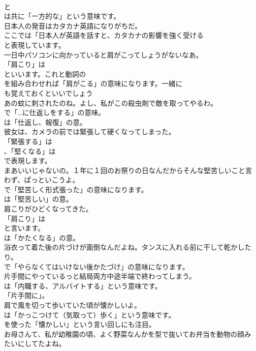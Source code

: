 \documentclass[8pt]{extreport}
\begin{document}
\begin{CJK}{UTF8}{min}
\\	と
\\	は共に「一方的な」という意味です。	
\\	日本人の発音はカタカナ英語になりがちだ。 
\\	ここでは「日本人が英語を話すと、カタカナの影響を強く受ける
\\	と表現しています。	
\\	一日中パソコンに向かっていると肩がこってしょうがないなあ。 
\\	「肩こり」は
\\	といいます。これと動詞の
\\	を組み合わせれば「肩がこる」の意味になります。一緒に
\\	も覚えておくといいでしょう	
\\	あの蚊に刺されたのね。よし、私がこの殺虫剤で敵を取ってやるわ。 
\\	で「…に仕返しをする」の意味。
\\	は「仕返し、報復」の意。	
\\	彼女は、カメラの前では緊張して硬くなってしまった。 
\\	「緊張する」は
\\	、「堅くなる」は
\\	で表現します。	
\\	まあいいじゃないの。１年に１回のお祭りの日なんだからそんな堅苦しいこと言わず、ぱっといこうよ。 
\\	で「堅苦しく形式張った」の意味になります。
\\	は「堅苦しい」の意。	
\\	肩こりがひどくなってきた。 
\\	「肩こり」は
\\	と言います。
\\	は「かたくなる」の意。	
\\	浴衣って着た後の片づけが面倒なんだよね。タンスに入れる前に干して乾かしたり。 
\\	で「やらなくてはいけない後かたづけ」の意味になります。	
\\	片手間にやっているっと結局両方中途半端で終わってしまう。 
\\	は「内職する、アルバイトする」という意味です。
\\	「片手間に」。	
\\	肩で風を切って歩いていた頃が懐かしいよ。 
\\	は「かっこつけて（気取って）歩く」という意味です。
\\	を使った「懐かしい」という言い回しにも注目。	
\\	お母さんて、私が幼稚園の頃、よく野菜なんかを型で抜いてお弁当を動物の顔みたいにしてたよね。 

\end{CJK}
\end{document}

